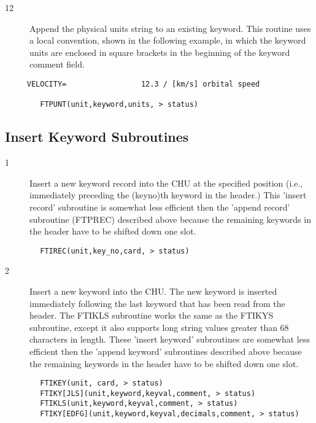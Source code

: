 \documentclass[11pt]{book}
\begin{document}
\begin{description}
\item[12] Append the physical units string to an existing keyword.  This
    routine uses a local convention, shown in the following example,
    in which the keyword units are enclosed in square brackets in the
   beginning of the keyword comment field.
\end{description}


\begin{verbatim}
     VELOCITY=                 12.3 / [km/s] orbital speed

        FTPUNT(unit,keyword,units, > status)
\end{verbatim}

\subsection{Insert Keyword Subroutines \label{FTIREC}}


\begin{description}
\item[1 ] Insert a new keyword record into the CHU at the specified position
    (i.e., immediately preceding the (keyno)th keyword in the header.)
    This 'insert record' subroutine is somewhat less efficient
    then the 'append record' subroutine (FTPREC) described above because
   the remaining keywords in the header have to be shifted down one slot.
\end{description}

\begin{verbatim}
        FTIREC(unit,key_no,card, > status)
\end{verbatim}

\begin{description}
\item[2 ] Insert a new keyword into the CHU.  The new keyword is inserted
    immediately following the last keyword that has been read from the header.
    The FTIKLS subroutine works the same as the FTIKYS subroutine, except
    it also supports long string values greater than 68 characters in length.
    These 'insert keyword' subroutines are somewhat less efficient then
    the 'append keyword' subroutines described above because the remaining
   keywords in the header have to be shifted down one slot.
\end{description}

\begin{verbatim}
        FTIKEY(unit, card, > status)
        FTIKY[JLS](unit,keyword,keyval,comment, > status)
        FTIKLS(unit,keyword,keyval,comment, > status)
        FTIKY[EDFG](unit,keyword,keyval,decimals,comment, > status)
\end{verbatim}
\end{document}
